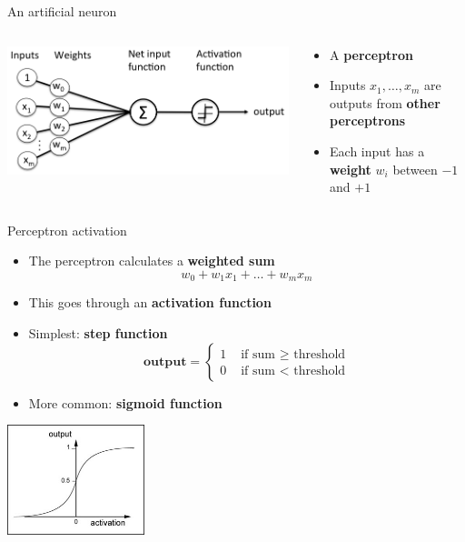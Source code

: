 \begin{frame}{An artificial neuron}
	\begin{columns}
		\begin{column}{0.48\textwidth}
			\includegraphics[width=\textwidth]{perceptron}
		\end{column}
		\begin{column}{0.48\textwidth}
			\begin{itemize}
				\pause\item A \textbf{perceptron}
				\pause\item Inputs $x_1, \dots, x_m$ are outputs from \textbf{other perceptrons}
				\pause\item Each input has a \textbf{weight} $w_i$ between $-1$ and $+1$
			\end{itemize}
		\end{column}
	\end{columns}
\end{frame}

\begin{frame}{Perceptron activation}
	\begin{itemize}
		\pause\item The perceptron calculates a \textbf{weighted sum}
			$$ w_0 + w_1 x_1 + \dots + w_m x_m $$
		\pause\item This goes through an \textbf{activation function}
		\pause\item Simplest: \textbf{step function}
			$$ \textbf{output} = \begin{cases}
				1 &\text{ if sum $\geq$ threshold} \\
				0 &\text{ if sum $<$ threshold}
			\end{cases}
			$$
		\pause\item More common: \textbf{sigmoid function}
	\end{itemize}
	\begin{center}
		\includegraphics[width=0.3\textwidth]{sigmoid}
	\end{center}
\end{frame}

